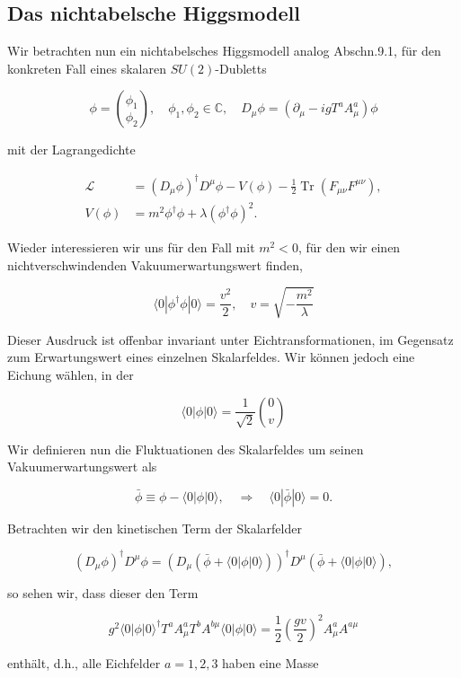 \documentclass[10pt, letterpaper]{article}
\begin{document}
\subsection*{Das nichtabelsche Higgsmodell}
Wir betrachten nun ein nichtabelsches Higgsmodell analog Abschn.9.1, für den konkreten Fall eines skalaren $S U(2)$-Dubletts

$$
\phi=\binom{\phi_{1}}{\phi_{2}}, \quad \phi_{1}, \phi_{2} \in \mathbb{C}, \quad D_{\mu} \phi=\left(\partial_{\mu}-i g T^{a} A_{\mu}^{a}\right) \phi
$$

mit der Lagrangedichte

$$
\begin{aligned}
\mathscr{L} & =\left(D_{\mu} \phi\right)^{\dagger} D^{\mu} \phi-V(\phi)-\frac{1}{2} \operatorname{Tr}\left(F_{\mu \nu} F^{\mu \nu}\right), \\
V(\phi) & =m^{2} \phi^{\dagger} \phi+\lambda\left(\phi^{\dagger} \phi\right)^{2} .
\end{aligned}
$$

Wieder interessieren wir uns für den Fall mit $m^{2}<0$, für den wir einen nichtverschwindenden Vakuumerwartungswert finden,

$$
\langle 0| \phi^{\dagger} \phi|0\rangle=\frac{v^{2}}{2}, \quad v=\sqrt{-\frac{m^{2}}{\lambda}}
$$

Dieser Ausdruck ist offenbar invariant unter Eichtransformationen, im Gegensatz zum Erwartungswert eines einzelnen Skalarfeldes. Wir können jedoch eine Eichung wählen, in der

$$
\langle 0| \phi|0\rangle=\frac{1}{\sqrt{2}}\binom{0}{v}
$$

Wir definieren nun die Fluktuationen des Skalarfeldes um seinen Vakuumerwartungswert als

$$
\bar{\phi} \equiv \phi-\langle 0| \phi|0\rangle, \quad \Rightarrow \quad\langle 0| \bar{\phi}|0\rangle=0 .
$$

Betrachten wir den kinetischen Term der Skalarfelder

$$
\left(D_{\mu} \phi\right)^{\dagger} D^{\mu} \phi=\left(D_{\mu}(\bar{\phi}+\langle 0| \phi|0\rangle)\right)^{\dagger} D^{\mu}(\bar{\phi}+\langle 0| \phi|0\rangle),
$$

so sehen wir, dass dieser den Term

$$
g^{2}\langle 0| \phi|0\rangle^{\dagger} T^{a} A_{\mu}^{a} T^{b} A^{b \mu}\langle 0| \phi|0\rangle=\frac{1}{2}\left(\frac{g v}{2}\right)^{2} A_{\mu}^{a} A^{a \mu}
$$

enthält, d.h., alle Eichfelder $a=1,2,3$ haben eine Masse
\end{document}
